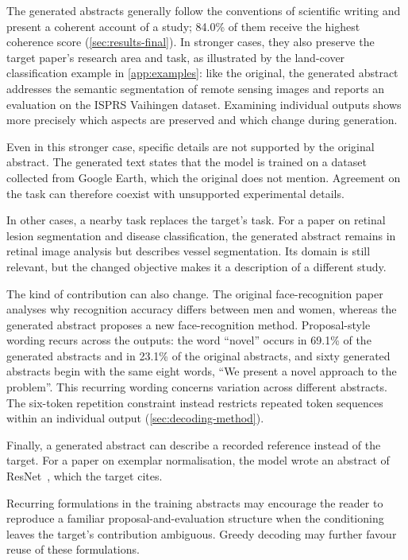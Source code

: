 The generated abstracts generally follow the conventions of scientific writing and present a coherent account of a study; 84.0\% of them receive the highest coherence score (\autoref{sec:results-final}). In stronger cases, they also preserve the target paper's research area and task, as illustrated by the land-cover classification example in \autoref{app:examples}: like the original, the generated abstract addresses the semantic segmentation of remote sensing images and reports an evaluation on the ISPRS Vaihingen dataset. Examining individual outputs shows more precisely which aspects are preserved and which change during generation.

Even in this stronger case, specific details are not supported by the original abstract. The generated text states that the model is trained on a dataset collected from Google Earth, which the original does not mention. Agreement on the task can therefore coexist with unsupported experimental details.

In other cases, a nearby task replaces the target's task. For a paper on retinal lesion segmentation and disease classification, the generated abstract remains in retinal image analysis but describes vessel segmentation. Its domain is still relevant, but the changed objective makes it a description of a different study.

The kind of contribution can also change. The original face-recognition paper analyses why recognition accuracy differs between men and women, whereas the generated abstract proposes a new face-recognition method. Proposal-style wording recurs across the outputs: the word ``novel'' occurs in 69.1\% of the generated abstracts and in 23.1\% of the original abstracts, and sixty generated abstracts begin with the same eight words, ``We present a novel approach to the problem''. This recurring wording concerns variation across different abstracts. The six-token repetition constraint instead restricts repeated token sequences within an individual output (\autoref{sec:decoding-method}).

Finally, a generated abstract can describe a recorded reference instead of the target. For a paper on exemplar normalisation, the model wrote an abstract of ResNet~\cite{he2016resnet}, which the target cites.

Recurring formulations in the training abstracts may encourage the reader to reproduce a familiar proposal-and-evaluation structure when the conditioning leaves the target's contribution ambiguous. Greedy decoding may further favour reuse of these formulations.

